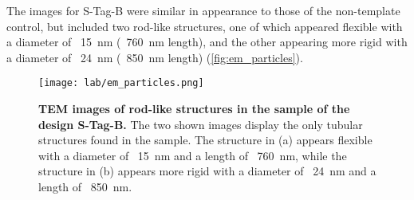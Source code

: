 The images for S-Tag-B were similar in appearance to those of the non-template control, but included two rod-like structures, one of which appeared flexible with a diameter of ~\SI{15}{\nano\meter} (~\SI{760}{\nano\meter} length), and the other appearing more rigid with a diameter of ~\SI{24}{\nano\meter} (~\SI{850}{\nano\meter} length) (\autoref{fig:em_particles}). 

\begin{figure}
\texttt{[image: lab/em\_particles.png]}
\caption{\textbf{TEM images of rod-like structures in the sample of the design S-Tag-B. } The two shown images display the only tubular structures found in the sample. The structure in (a) appears flexible with a diameter of ~\SI{15}{\nano\meter} and a length of ~\SI{760}{\nano\meter}, while the structure in (b) appears more rigid with a diameter of ~\SI{24}{\nano\meter} and a length of ~\SI{850}{\nano\meter}.}
\label{fig:em_particles}
\end{figure}
